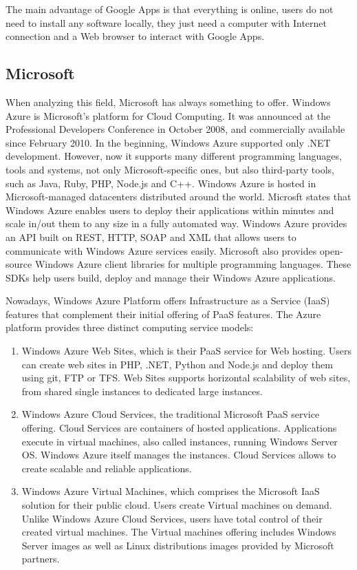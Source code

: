 \par
The main advantage of Google Apps is that everything is online, users do not need to install any software locally, they just need a computer with Internet connection and a Web browser to interact with Google Apps.

\subsection{Microsoft}

When analyzing this field, Microsoft has always something to offer. Windows Azure \cite{Azure} is Microsoft's platform for Cloud Computing. It was announced at the Professional Developers Conference in October 2008,  and commercially available since February 2010. In the beginning, Windows Azure supported only .NET development. However, now it supports many different programming languages, tools and systems, not only Microsoft-specific ones, but also third-party tools, such as Java, Ruby, PHP, Node.js and C++. Windows Azure is hosted in Microsoft-managed datacenters distributed around the world. Microsft states that Windows Azure enables users to deploy their applications within minutes and scale in/out them to any size in a fully automated way.
Windows Azure provides an API built on REST, HTTP, SOAP and XML that allows users to communicate with Windows Azure services easily. Microsoft also provides open-source Windows Azure client libraries for multiple programming languages. These SDKs help users build, deploy and manage their Windows Azure applications.
\par
Nowadays, Windows Azure Platform offers Infrastructure as a Service (IaaS) features that complement their initial offering of PaaS features. The Azure platform provides three distinct computing service models:
\begin{enumerate}
\item Windows Azure Web Sites, which is their PaaS service for Web hosting. Users can create web sites in PHP, .NET, Python and Node.js and deploy them using git, FTP or TFS. Web Sites supports horizontal scalability of web sites, from shared single instances to dedicated large instances.
\item Windows Azure Cloud Services, the traditional Microsoft PaaS service offering. Cloud Services are containers of hosted applications. Applications execute in virtual machines, also called instances, running Windows Server OS. Windows Azure itself manages the instances. Cloud Services allows to create scalable and reliable applications.
\item Windows Azure Virtual Machines, which comprises the Microsoft IaaS solution for their public cloud. Users create Virtual machines on demand. Unlike Windows Azure Cloud Services, users have total control of their created virtual machines. The Virtual machines offering includes Windows Server images as well as Linux distributions images provided by Microsoft partners.
\end{enumerate}

